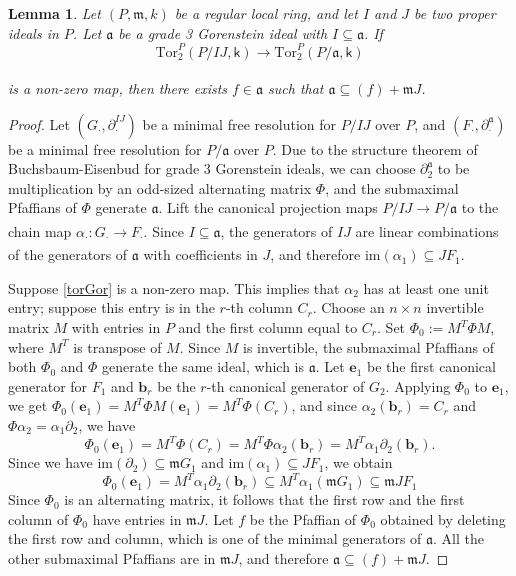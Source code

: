 \documentclass[10pt,reqno]{amsart}
\newtheorem{lemma}[subsection]{Lemma}
\theoremstyle{definition}
\theoremstyle{remark}
\numberwithin{equation}{section}
\newcommand{\Tor}{\mathrm{Tor}}
\newcommand{\kk}{\mathsf k}
\newcommand{\m}{\mathfrak m}
\numberwithin{equation}{section}
\begin{document}
\begin{lemma}\label{mainlemma1}
    Let $(P,\m,k)$ be a regular local ring, and let $I$ and $J$ be two proper ideals in $P$. Let $\mathfrak a$ be a grade 3 Gorenstein ideal with $I\subseteq \mathfrak a$. If \begin{equation}\label{torGor}
     \Tor_{2}^P(P/IJ,\kk)\xrightarrow[]{} \Tor_{2}^P(P/\mathfrak a,\kk)   
    \end{equation}
     
    is a non-zero map, then there exists $f\in \mathfrak a$ such that $\mathfrak a\subseteq (f)+\m J$.
\end{lemma}
\begin{proof}
    Let $(G_{\cdot},\partial^{IJ}_{\cdot})$ be a minimal free resolution for $P/IJ$ over $P$, and $(F_{\cdot},\partial^{\mathfrak a}_{\cdot})$ be a minimal free resolution for $P/\mathfrak a$ over $P$. Due to the structure theorem of Buchsbaum-Eisenbud\cite{buchsbaum1977algebra} for grade 3 Gorenstein ideals, we can choose $\partial^{\mathfrak a}_2$ to be multiplication by an odd-sized alternating matrix $\Phi$, and the submaximal Pfaffians of $\Phi$ generate $\mathfrak a$. Lift the canonical projection maps $P/IJ\xrightarrow[]{}P/ \mathfrak a$ to the chain map $\alpha_{\cdot}:G_{\cdot}\xrightarrow[]{}F_{\cdot}$. Since $I\subseteq \mathfrak a$, the generators of $IJ$ are linear combinations of the generators of $\mathfrak a$ with coefficients in $J$, and therefore $\mathrm{im}(\alpha_1)\subseteq JF_1$.

Suppose \cref{torGor} is a non-zero map. This implies that $\alpha_2$ has at least one unit entry; suppose this entry is in the $ r$-th column $C_r$. Choose an $n\times n$ invertible matrix $M$ with entries in $P$ and the first column equal to $C_r$. Set $\Phi_0:=M^{T}\Phi M$, where $M^T$ is transpose of $M$. Since $M$ is invertible, the submaximal Pfaffians of both $\Phi_0$ and $\Phi$ generate the same ideal, which is $\mathfrak a$. Let $\mathbf{e}_1$ be the first canonical generator for $F_1$ and $\mathbf{b}_r$ be the $ r$-th canonical generator of $G_2$. Applying $\Phi_0$ to $\mathbf{e}_1$, we get $
\Phi_0(\mathbf e_1)= M^T \Phi M (\mathbf{e}_1)=M^T \Phi (C_r)$, and since $ \alpha_2(\textbf{b}_r)=C_r$ and $\Phi\alpha_2=\alpha_1 \partial_2$, we have 
\[
\Phi_0(\textbf{e}_1)=M^T\Phi (C_r)= M^T\Phi \alpha_2(\mathbf{b}_r)=M^T\alpha_1\partial_2(\mathbf b_r).
\] 
Since we have $\mathrm{im} (\partial_2)\subseteq \m G_1$ and $\mathrm{im}(\alpha_1)\subseteq JF_1$, we obtain \[\Phi_0(\mathbf e_1)=M^T\alpha_1\partial_2(\mathbf b_r)\subseteq M^T\alpha_1(\m G_1)\subseteq \m JF_1\]
Since $\Phi_0$ is an alternating matrix, it follows that the first row and the first column of $\Phi_0$ have entries in $\m J$. Let $f$ be the Pfaffian of $\Phi_0$ obtained by deleting the first row and column, which is one of the minimal generators of $\mathfrak a$. All the other submaximal Pfaffians are in $\m J$, and therefore $\mathfrak a\subseteq (f)+\m J$.
\end{proof}
\end{document}
